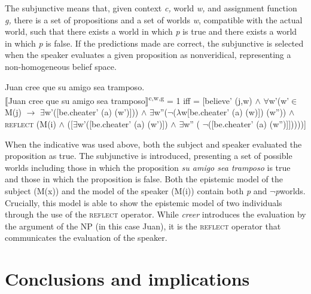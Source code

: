 \documentclass[output=paper,colorlinks,citecolor=brown,
]{langscibook}
\begin{document}
The subjunctive means that, given context \textit{c, }world \textit{w, }and assignment function \textit{g, }there is a set of propositions and a set of worlds \textit{w}, compatible with the actual world, such that there exists a world in which \textit{p} is true and there exists a world in which \textit{p} is false. If the predictions made are correct, the subjunctive is selected when the speaker evaluates a given proposition as nonveridical, representing a non-homogeneous belief space. 

\begin{exe}
    \ex\label{ex:bove:25}
        Juan cree que su amigo sea tramposo.\\
    ⟦Juan cree que su amigo sea tramposo⟧\textsuperscript{c,w,g} = 1 iff =
    [believe' (j,w) ${\wedge}$ ${\forall}$w'(w'${\in}$ M(j) $\rightarrow$ ${\exists}$w'([be.cheater' (a) (w')])) ${\wedge}$ ${\exists}$w''($\neg$($\lambda$w[be.cheater' (a) (w)]) (w'')) ${\wedge}$ \textsc{reflect} (M(i) ${\wedge}$ ([${\exists}$w'([be.cheater' (a) (w')]) ${\wedge}$ ${\exists}$w'' ( $\neg$([be.cheater' (a) (w'')]]))))]
\end{exe}



When the indicative was used above, both the subject and speaker evaluated the proposition as true. The subjunctive is introduced, presenting a set of possible worlds including those in which the proposition \textit{su amigo sea tramposo} is true and those in which the proposition is false. Both the epistemic model of the subject (M(x)) and the model of the speaker (M(i)) contain both \textit{p} and $\neg$\textit{p}worlds. Crucially, this model is able to show the epistemic model of two individuals through the use of the \textsc{reflect} operator. While \textit{creer} introduces the evaluation by the argument of the NP (in this case Juan), it is the \textsc{reflect} operator that communicates the evaluation of the speaker. 

\section{Conclusions and implications}
\end{document}
